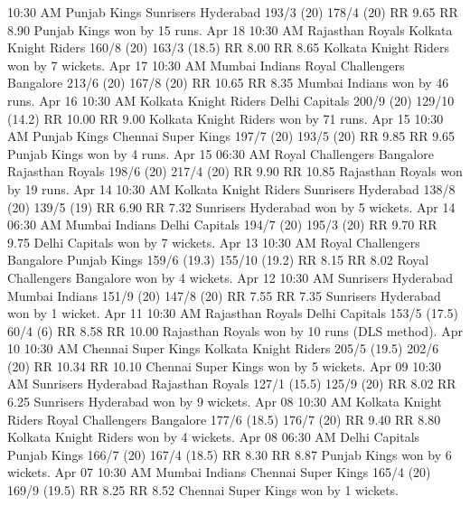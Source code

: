 10:30 AM
Punjab Kings
Sunrisers Hyderabad
193/3 (20)
178/4 (20)
RR 9.65
RR 8.90
Punjab Kings won by 15 runs.
Apr 18
10:30 AM
Rajasthan Royals
Kolkata Knight Riders
160/8 (20)
163/3 (18.5)
RR 8.00
RR 8.65
Kolkata Knight Riders won by 7 wickets.
Apr 17
10:30 AM
Mumbai Indians
Royal Challengers Bangalore
213/6 (20)
167/8 (20)
RR 10.65
RR 8.35
Mumbai Indians won by 46 runs.
Apr 16
10:30 AM
Kolkata Knight Riders
Delhi Capitals
200/9 (20)
129/10 (14.2)
RR 10.00
RR 9.00
Kolkata Knight Riders won by 71 runs.
Apr 15
10:30 AM
Punjab Kings
Chennai Super Kings
197/7 (20)
193/5 (20)
RR 9.85
RR 9.65
Punjab Kings won by 4 runs.
Apr 15
06:30 AM
Royal Challengers Bangalore
Rajasthan Royals
198/6 (20)
217/4 (20)
RR 9.90
RR 10.85
Rajasthan Royals won by 19 runs.
Apr 14
10:30 AM
Kolkata Knight Riders
Sunrisers Hyderabad
138/8 (20)
139/5 (19)
RR 6.90
RR 7.32
Sunrisers Hyderabad won by 5 wickets.
Apr 14
06:30 AM
Mumbai Indians
Delhi Capitals
194/7 (20)
195/3 (20)
RR 9.70
RR 9.75
Delhi Capitals won by 7 wickets.
Apr 13
10:30 AM
Royal Challengers Bangalore
Punjab Kings
159/6 (19.3)
155/10 (19.2)
RR 8.15
RR 8.02
Royal Challengers Bangalore won by 4 wickets.
Apr 12
10:30 AM
Sunrisers Hyderabad
Mumbai Indians
151/9 (20)
147/8 (20)
RR 7.55
RR 7.35
Sunrisers Hyderabad won by 1 wicket.
Apr 11
10:30 AM
Rajasthan Royals
Delhi Capitals
153/5 (17.5)
60/4 (6)
RR 8.58
RR 10.00
Rajasthan Royals won by 10 runs (DLS method).
Apr 10
10:30 AM
Chennai Super Kings
Kolkata Knight Riders
205/5 (19.5)
202/6 (20)
RR 10.34
RR 10.10
Chennai Super Kings won by 5 wickets.
Apr 09
10:30 AM
Sunrisers Hyderabad
Rajasthan Royals
127/1 (15.5)
125/9 (20)
RR 8.02
RR 6.25
Sunrisers Hyderabad won by 9 wickets.
Apr 08
10:30 AM
Kolkata Knight Riders
Royal Challengers Bangalore
177/6 (18.5)
176/7 (20)
RR 9.40
RR 8.80
Kolkata Knight Riders won by 4 wickets.
Apr 08
06:30 AM
Delhi Capitals
Punjab Kings
166/7 (20)
167/4 (18.5)
RR 8.30
RR 8.87
Punjab Kings won by 6 wickets.
Apr 07
10:30 AM
Mumbai Indians
Chennai Super Kings
165/4 (20)
169/9 (19.5)
RR 8.25
RR 8.52
Chennai Super Kings won by 1 wickets.